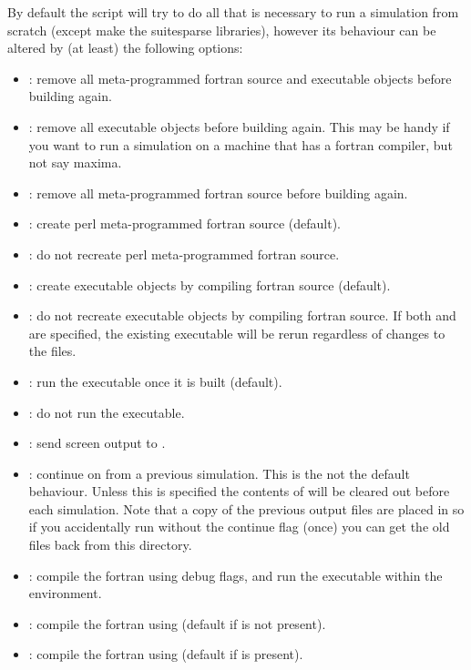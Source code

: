 By default the  script will try to do all that is necessary to run a simulation from scratch (except make the suitesparse libraries), however its behaviour can be altered by (at least) the following options:
%
\begin{itemize}
\item {}: remove all meta-programmed fortran source and executable objects before building again.
\item {}: remove all executable objects before building again.  This may be handy if you want to run a simulation on a machine that has a fortran compiler, but not say maxima.
\item {}: remove all meta-programmed fortran source before building again.
\item {}: create perl meta-programmed fortran source (default).
\item {}: do not recreate perl meta-programmed fortran source.
\item {}: create executable objects by compiling fortran source (default).
\item {}: do not recreate executable objects by compiling fortran source.  If both  and  are specified, the existing  executable will be rerun regardless of changes to the  files.
\item {}: run the  executable once it is built (default).
\item {}: do not run the  executable.
\item {}: send screen output to .
\item {}: continue on from a previous simulation.  This is the not the default behaviour.  Unless this is specified the contents of  will be cleared out before each simulation.  Note that a copy of the previous output files are placed in  so if you accidentally run  without the continue flag (once) you can get the old files back from this directory.
\item {}: compile the fortran using debug flags, and run the executable within the  environment.
\item {}: compile the fortran using  (default if  is not present).
\item {}: compile the fortran using  (default if  is present).
\end{itemize}

